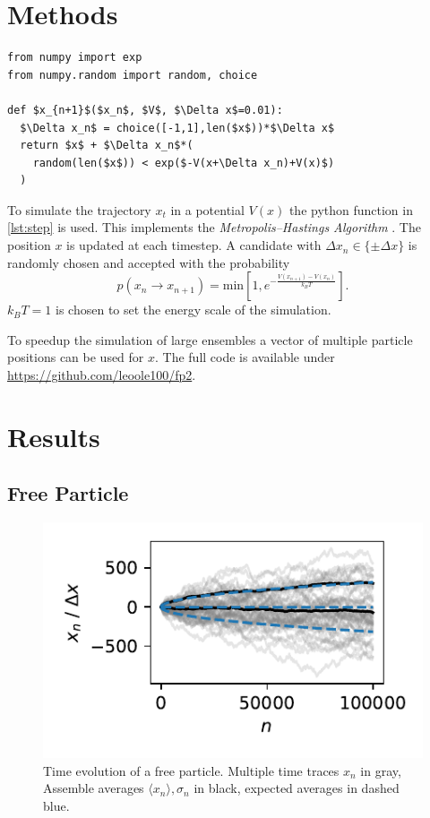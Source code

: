 \documentclass[
    parskip=half, 
    twoside=false,
    twocolumn=true,
    fontsize=11pt,
]{scrarticle}
\begin{document}
\section{Methods}
\begin{lstlisting}[caption={Python function used for time evolution.},label={lst:step},captionpos=b]
from numpy import exp
from numpy.random import random, choice

def $x_{n+1}$($x_n$, $V$, $\Delta x$=0.01):
  $\Delta x_n$ = choice([-1,1],len($x$))*$\Delta x$
  return $x$ + $\Delta x_n$*(
    random(len($x$)) < exp($-V(x+\Delta x_n)+V(x)$)
  )
\end{lstlisting}
To simulate the trajectory $x_t$ in a potential $V(x)$ the python function in \autoref{lst:step} is used.
This implements the \textit{Metropolis–Hastings Algorithm} \cite{noauthor_metropolis-algorithmus_2024}.
The position $x$ is updated at each timestep.
A candidate with $\Delta x_n \in \{\pm \Delta x\}$ is randomly chosen and accepted with the probability
$$ p(x_n \rightarrow x_{n+1}) = \text{min}\left[1,e^{-\frac{V(x_{n+1})-V(x_n)}{k_B T}}\right] \text{.}$$
$k_B T = 1$ is chosen to set the energy scale of the simulation.

To speedup the simulation of large ensembles a vector of multiple particle positions can be used for $x$.
The full code is available under \url{https://github.com/leoole100/fp2}.

\section{Results}
\subsection{Free Particle}
\begin{figure}
    \centering
    \includegraphics{figures/01 time trace.pdf}
    \caption{
        Time evolution of a free particle.
        Multiple time traces $x_n$ in gray, Assemble averages $\langle x_n\rangle, \sigma_n$ in black, expected averages in dashed blue.
    }
    \label{fig:pt1_trajectory}
\end{figure}
\end{document}

